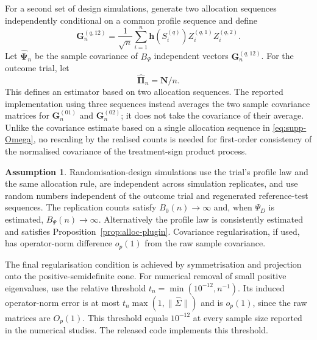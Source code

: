 \documentclass[12pt,a4paper]{article}
\theoremstyle{definition}
\newtheorem{assumption}{Assumption}
\theoremstyle{remark}\newtheorem{remark}{Remark}
\numberwithin{equation}{section}
\begin{document}
For a second set of design simulations, generate two allocation sequences independently conditional on a common profile sequence and define
\begin{equation}\label{eq:supp-G-calibration}
\bm G_n^{(q,12)}
=\frac1{\sqrt n}\sum_{i=1}^n
\bm h(S_i^{(q)})Z_i^{(q,1)}Z_i^{(q,2)}.
\end{equation}
Let $\widehat{\bm\Psi}_n$ be the sample covariance of $B_\Psi$ independent vectors $\bm G_n^{(q,12)}$. For the outcome trial, let
\begin{equation}\label{eq:supp-Pi-hat}
\widehat{\bm\Pi}_n=\bm N/n.
\end{equation}
This defines an estimator based on two allocation sequences. The reported implementation using three sequences instead averages the two sample covariance matrices for $\bm G_n^{(01)}$ and $\bm G_n^{(02)}$; it does not take the covariance of their average. Unlike the covariance estimate based on a single allocation sequence in \eqref{eq:supp-Omega}, no rescaling by the realised counts is needed for first-order consistency of the normalised covariance of the treatment-sign product process.


\begin{assumption}\label{ass:supp-calibration}
Randomisation-design simulations use the trial's profile law and the same allocation rule, are independent across simulation replicates, and use random numbers independent of the outcome trial and regenerated reference-test sequences. The replication counts satisfy $B_0(n)\to\infty$ and, when $\Psi_D$ is estimated, $B_\Psi(n)\to\infty$. Alternatively the profile law is consistently estimated and satisfies Proposition~\ref{prop:alloc-plugin}. Covariance regularisation, if used, has operator-norm difference $o_p(1)$ from the raw sample covariance.
\end{assumption}
The final regularisation condition is achieved by symmetrisation and projection onto the positive-semidefinite cone. For numerical removal of small positive eigenvalues, use the relative threshold $t_n=\min(10^{-12},n^{-1})$. Its induced operator-norm error is at most $t_n\max(1,\|\widehat\Sigma\|)$ and is $o_p(1)$, since the raw matrices are $O_p(1)$. This threshold equals $10^{-12}$ at every sample size reported in the numerical studies. The released code implements this threshold.
\end{document}
